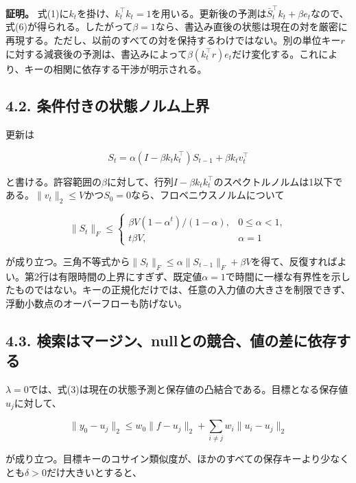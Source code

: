 \documentclass[11pt,a4paper]{article}
\begin{document}
\textbf{証明。} 式(1)に\(k_t\)を掛け、\(k_t^{\top}k_t=1\)を用いる。更新後の予測は\(\bar S_t^{\top}k_t+\beta e_t\)なので、式(6)が得られる。したがって\(\beta=1\)なら、書込み直後の状態は現在の対を厳密に再現する。ただし、以前のすべての対を保持するわけではない。別の単位キー\(r\)に対する減衰後の予測は、書込みによって\(\beta(k_t^{\top}r)e_t\)だけ変化する。これにより、キーの相関に依存する干渉が明示される。

\subsection{4.2. 条件付きの状態ノルム上界}\label{ux6761ux4ef6ux4ed8ux304dux306eux72b6ux614bux30ceux30ebux30e0ux4e0aux754c}

更新は

\nopagebreak[4]

\[
S_t=\alpha(I-\beta k_tk_t^{\top})S_{t-1}+\beta k_tv_t^{\top}
\tag{7}
\]

と書ける。許容範囲の\(\beta\)に対して、行列\(I-\beta k_tk_t^{\top}\)のスペクトルノルムは1以下である。\(\|v_t\|_2\leq V\)かつ\(S_0=0\)なら、フロベニウスノルムについて

\nopagebreak[4]

\[
\|S_t\|_F\leq
\begin{cases}
\beta V(1-\alpha^t)/(1-\alpha), & 0\leq\alpha<1,\\
t\beta V, & \alpha=1
\end{cases}
\tag{8}
\]

が成り立つ。三角不等式から\(\|S_t\|_F\leq\alpha\|S_{t-1}\|_F+\beta V\)を得て、反復すればよい。第2行は有限時間の上界にすぎず、既定値\(\alpha=1\)で時間に一様な有界性を示したものではない。キーの正規化だけでは、任意の入力値の大きさを制限できず、浮動小数点のオーバーフローも防げない。

\subsection{4.3. 検索はマージン、nullとの競合、値の差に依存する}\label{ux691cux7d22ux306fux30deux30fcux30b8ux30f3nullux3068ux306eux7af6ux5408ux5024ux306eux5deeux306bux4f9dux5b58ux3059ux308b}

\(\lambda=0\)では、式(3)は現在の状態予測と保存値の凸結合である。目標となる保存値\(u_j\)に対して、

\nopagebreak[4]

\[
\|y_0-u_j\|_2\leq w_0\|f-u_j\|_2+
\sum_{i\ne j}w_i\|u_i-u_j\|_2
\tag{9}
\]

が成り立つ。目標キーのコサイン類似度が、ほかのすべての保存キーより少なくとも\(\delta>0\)だけ大きいとすると、
\end{document}
